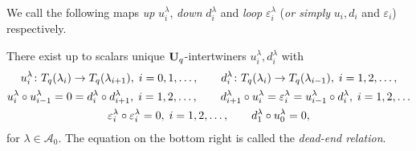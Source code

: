 We call the following maps 
\textit{up} $u^{\lambda}_i$, 
\textit{down} $d^{\lambda}_i$ and 
\textit{loop} $\varepsilon^{\lambda}_i$ 
(\textit{or simply} $u_i,d_i$ and $\varepsilon_i$) respectively.



\begin{prop}\label{prop-link}
There exist up to scalars unique 
$\boldsymbol{\mathrm{U}}_q$-intertwiners $u^{\lambda}_i,d^{\lambda}_i$ with
\begin{gather*}
u^{\lambda}_i\colon T_q({\lambda_i})\to T_q({\lambda_{i+1}}),\; i=0,1,\dots,\quad\quad d^{\lambda}_i\colon T_q({\lambda_i})\to T_q({\lambda_{i-1}}),\; i=1,2,\dots,
\\
u^{\lambda}_{i}\circ u^{\lambda}_{i-1}=0=d^{\lambda}_i\circ d^{\lambda}_{i+1},\; i=1,2,\dots,\quad\quad d^{\lambda}_{i+1}\circ u^{\lambda}_i=\varepsilon_i^{\lambda}=u^{\lambda}_{i-1}\circ d^{\lambda}_{i},\; i=1,2,\dots
\\
\varepsilon_i^{\lambda}\circ\varepsilon_i^{\lambda}=0,\; i=1,2,\dots
,\quad\quad d^{\lambda}_1\circ u^{\lambda}_0=0,
\end{gather*}
for $\lambda\in\mathcal A_0$. 
The equation on the bottom right is called 
the \textit{dead-end relation}.\makeqed
\end{prop}



